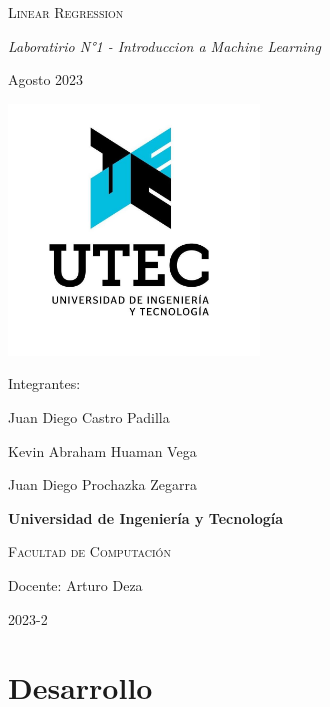 \documentclass{report}
\begin{document}
\begin{titlepage}
    \centering
    {\scshape\Huge Linear Regression\par}
    \vspace{0.5cm}
    {\itshape\Large Laboratirio N°1 - Introduccion a Machine Learning \par}
    \vspace{0.5cm}
    {\Large Agosto 2023 \par}
    \vspace{0.5cm}
    {\includegraphics[width=0.5\textwidth]{latex/utec.jpg}\par}
    \vfill
    {\Large Integrantes: \par}
    {\Large Juan Diego Castro Padilla\par}
    {\Large Kevin Abraham Huaman Vega\par}
    {\Large Juan Diego Prochazka Zegarra\par}
    \vfill
    \vspace{0.5cm}
    {\bfseries\LARGE Universidad de Ingenier\'ia y Tecnolog\'ia\par}
    \vspace{0.5cm}
    {\scshape\Large Facultad de Computaci\'on \par}
    \vspace{0.5cm}
    {\Large Docente: Arturo Deza\par}
    \vspace{0.5cm}
    {\Large 2023-2 \par}
    \vspace{1.5cm}

\end{titlepage}

\tableofcontents

\pagebreak

\noindent

    \chapter{Desarrollo}
\end{document}
